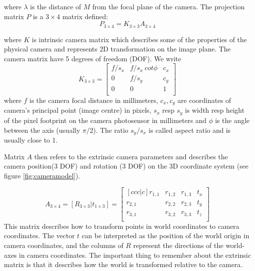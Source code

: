 where $\lambda$ is the distance of $M$ from the focal plane of the camera. The projection matrix $P$ is a $3 \times 4$ matrix defined:
\begin{equation}
	P_{3 \times 4}= K_{3 \times 3}A_{3 \times 4}
\end{equation}

where $K$ is intrinsic camera matrix which describes some of the properties of the physical camera and represents 2D transformation on the image plane. The camera matrix have 5 degrees of freedom (DOF). We write
\begin{equation}
	K_{3 \times 3} = 
	\begin{bmatrix}
		f/s_x & f/s_x ~cot \phi & c_x \\
		0 & f/s_y & c_y \\
		0 & 0  & 1 \\
	\end{bmatrix}
\end{equation}
where $f$ is the camera focal distance in millimeters, $c_x, c_y$ are coordinates of camera's principal point (image centre) in pixels, $s_x$ resp $s_y$ is width resp height of the pixel footprint on the camera photosensor in millimeters and $\phi$ is the angle between the axis (usually $\pi /2$). The ratio $s_y/s_x$ is called aspect ratio and is usually close to 1.

Matrix $A$ then refers to the extrinsic camera parameters and describes the camera position(3 DOF) and rotation (3 DOF) on the 3D coordinate system (see figure \ref{fig:cameramodel}).

\begin{equation}
	A_{3 \times 4} = [R_{3 \times 3} |t_{1 \times 3}] =
	\begin{bmatrix}[ccc|c]
		r_{1,1} & r_{1,2} & r_{1,3} & t_{x} \\
		r_{2,1} & r_{2,2} & r_{2,3} & t_{y} \\
		r_{3,1} & r_{3,2} & r_{3,3} & t_{z} \\
	\end{bmatrix}
\end{equation}
This matrix describes how to transform points in world coordinates to camera coordinates. The vector $t$ can be interpreted as the position of the world origin in camera coordinates, and the columns of $R$ represent the directions of the world-axes in camera coordinates. The important thing to remember about the extrinsic matrix is that it describes how the world is transformed relative to the camera. \cite{www:extrinsic-camera, www:visual-3D-modeling, solem}

